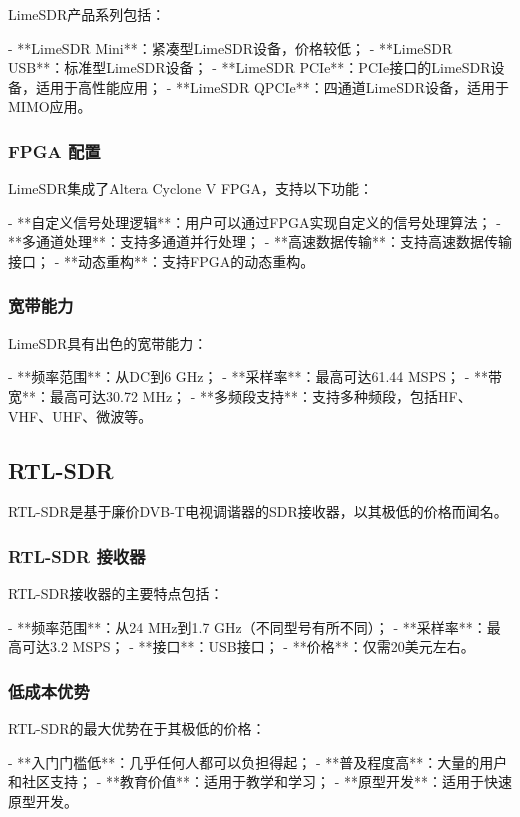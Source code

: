 ﻿\documentclass[UTF8]{ctexbook}
\begin{document}
LimeSDR产品系列包括：

- **LimeSDR Mini**：紧凑型LimeSDR设备，价格较低；
- **LimeSDR USB**：标准型LimeSDR设备；
- **LimeSDR PCIe**：PCIe接口的LimeSDR设备，适用于高性能应用；
- **LimeSDR QPCIe**：四通道LimeSDR设备，适用于MIMO应用。

\subsubsection{FPGA 配置}

LimeSDR集成了Altera Cyclone V FPGA，支持以下功能：

- **自定义信号处理逻辑**：用户可以通过FPGA实现自定义的信号处理算法；
- **多通道处理**：支持多通道并行处理；
- **高速数据传输**：支持高速数据传输接口；
- **动态重构**：支持FPGA的动态重构。

\subsubsection{宽带能力}

LimeSDR具有出色的宽带能力：

- **频率范围**：从DC到6 GHz；
- **采样率**：最高可达61.44 MSPS；
- **带宽**：最高可达30.72 MHz；
- **多频段支持**：支持多种频段，包括HF、VHF、UHF、微波等。

\subsection{RTL-SDR}

RTL-SDR是基于廉价DVB-T电视调谐器的SDR接收器，以其极低的价格而闻名。

\subsubsection{RTL-SDR 接收器}

RTL-SDR接收器的主要特点包括：

- **频率范围**：从24 MHz到1.7 GHz（不同型号有所不同）；
- **采样率**：最高可达3.2 MSPS；
- **接口**：USB接口；
- **价格**：仅需20美元左右。

\subsubsection{低成本优势}

RTL-SDR的最大优势在于其极低的价格：

- **入门门槛低**：几乎任何人都可以负担得起；
- **普及程度高**：大量的用户和社区支持；
- **教育价值**：适用于教学和学习；
- **原型开发**：适用于快速原型开发。
\end{document}
